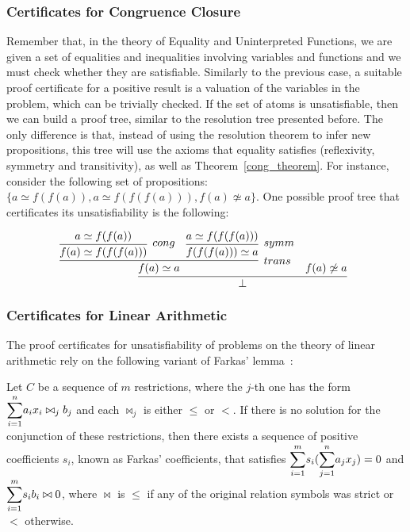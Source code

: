 \subsubsection{Certificates for Congruence Closure}

Remember that, in the theory of Equality and Uninterpreted Functions, we are given a set of equalities and inequalities involving variables and functions and we must check whether they are satisfiable. Similarly to the previous case, a suitable proof certificate for a positive result is a valuation of the variables in the problem, which can be trivially checked. If the set of atoms is unsatisfiable, then we can build a proof tree, similar to the resolution tree presented before. The only difference is that, instead of using the resolution theorem to infer new propositions, this tree will use the axioms that equality satisfies (reflexivity, symmetry and transitivity), as well as Theorem~\ref{cong_theorem}. For instance, consider the following set of propositions: $\{a \simeq f(f(a)), a \simeq f(f(f(a))), f(a) \not\simeq a\}$. One possible proof tree that certificates its unsatisfiability is the following:

\[
  \infer[]{\bot}{\infer[trans]{f(a) \simeq a}{\infer[cong]{f(a) \simeq f(f(f(a)))}{a \simeq f(f(a))} & \infer[symm]{f(f(f(a))) \simeq a}{a \simeq f(f(f(a)))}} & f(a) \not\simeq a}
\]

\subsubsection{Certificates for Linear Arithmetic}

The proof certificates for unsatisfiability of problems on the theory of linear arithmetic rely on the following variant of Farkas' lemma~\cite{farkas_ref}:

\begin{theorem}\label{farkas_lemma}
  Let $C$ be a sequence of $m$ restrictions, where the $j$-th one has the form $\mathlarger{\sum}_{i = 1}^{n} a_{i} x_{i} \bowtie_{j} b_{j}$ and each $\bowtie_{j}$ is either $\le$ or $<$. If there is no solution for the conjunction of these restrictions, then there exists a sequence of positive coefficients $s_{i}$, known as Farkas' coefficients, that satisfies $\mathlarger{\sum}_{i = 1}^{m} s_{i} (\mathlarger{\sum}_{j = 1}^{n} a_{j} x_{j}) = 0$ and $\mathlarger{\sum}_{i = 1}^{m} s_{i} b_{i} \bowtie 0$, where $\bowtie$ is $\le$ if any of the original relation symbols was strict or $<$ otherwise.
\end{theorem}


